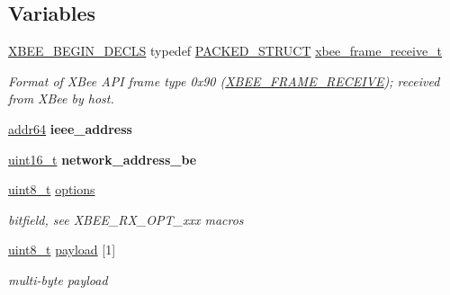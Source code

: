 \subsection*{Variables}
\begin{DoxyCompactItemize}
\item 
\hyperlink{group__hal_ga336bff4f4a6012aacc4468132bbd3d7f}{X\+B\+E\+E\+\_\+\+B\+E\+G\+I\+N\+\_\+\+D\+E\+C\+LS} typedef \hyperlink{group___s_x_a_ga4233297bd31be5c273d4fb0758cc54d7}{P\+A\+C\+K\+E\+D\+\_\+\+S\+T\+R\+U\+CT} \hyperlink{group__xbee__wpan_ga0d1e37574952bdf60cda7f1351b41a9e}{xbee\+\_\+frame\+\_\+receive\+\_\+t}
\begin{DoxyCompactList}\small\item\em Format of X\+Bee A\+PI frame type 0x90 (\hyperlink{group__xbee__device_gga7753bbebaf00d6d64942f64b6ae9b7b9ab6fa3650abecfac4645c5d4ccdf857fd}{X\+B\+E\+E\+\_\+\+F\+R\+A\+M\+E\+\_\+\+R\+E\+C\+E\+I\+VE}); received from X\+Bee by host. \end{DoxyCompactList}\item 
\mbox{\label{group__xbee__wpan_ga2549f921e25a72dfa05a2154a792e2bf}} 
\hyperlink{unionaddr64}{addr64} {\bfseries ieee\+\_\+address}
\item 
\mbox{\label{group__xbee__wpan_ga73d48563eb05cd5fcc4add79d226a3b8}} 
\hyperlink{group__hal__dos_ga5a8b2dc9e45a9ee81a94ef304fb62505}{uint16\+\_\+t} {\bfseries network\+\_\+address\+\_\+be}
\item 
\hyperlink{group__hal__dos_gae1affc9ca37cfb624959c866a73f83c2}{uint8\+\_\+t} \hyperlink{group__xbee__wpan_gaace3d640c8d449b8db1162993d259d3f}{options}
\begin{DoxyCompactList}\small\item\em bitfield, see X\+B\+E\+E\+\_\+\+R\+X\+\_\+\+O\+P\+T\+\_\+xxx macros \end{DoxyCompactList}\item 
\mbox{\label{group__xbee__wpan_gae6f5e79770e3e599bf8154eac1a2f3fe}} 
\hyperlink{group__hal__dos_gae1affc9ca37cfb624959c866a73f83c2}{uint8\+\_\+t} \hyperlink{group__xbee__wpan_gae6f5e79770e3e599bf8154eac1a2f3fe}{payload} \mbox{[}1\mbox{]}
\begin{DoxyCompactList}\small\item\em multi-\/byte payload \end{DoxyCompactList}\item 

\end{DoxyCompactItemize}

